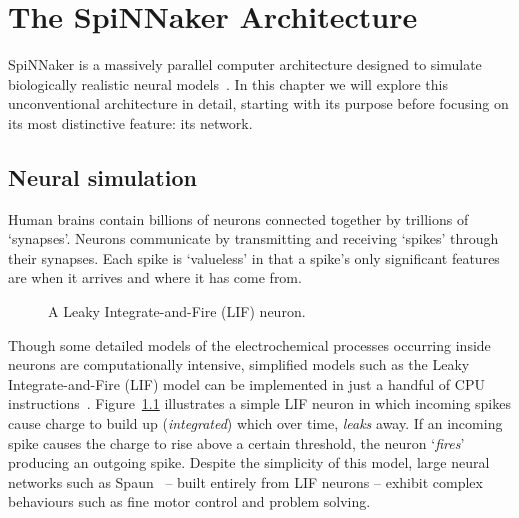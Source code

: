 \chapter{The SpiNNaker Architecture}
	
	\label{sec:background}
	
	SpiNNaker is a massively parallel computer architecture designed to simulate
	biologically realistic neural models~\cite{furber07}. In this chapter we will
	explore this unconventional architecture in detail, starting with its purpose
	before focusing on its most distinctive feature: its network.
	
	
	\section{Neural simulation}
		
		Human brains contain billions of neurons connected together by trillions of
		`synapses'. Neurons communicate by transmitting and receiving `spikes'
		through their synapses. Each spike is `valueless' in that a spike's only
		significant features are when it arrives and where it has come from.
		
		\begin{figure}
			\center
			
			\caption{A Leaky Integrate-and-Fire (LIF) neuron.}
			\label{fig:lif-neuron}
		\end{figure}
		
		Though some detailed models of the electrochemical processes occurring
		inside neurons are computationally intensive, simplified models such as the
		Leaky Integrate-and-Fire (LIF) model can be implemented in just a handful
		of CPU instructions~\cite{vainbrand11}. Figure~\ref{fig:lif-neuron}
		illustrates a simple LIF neuron in which incoming spikes cause charge to
		build up (\emph{integrated}) which over time, \emph{leaks} away. If an
		incoming spike causes the charge to rise above a certain threshold, the
		neuron `\emph{fires}' producing an outgoing spike. Despite the simplicity
		of this model, large neural networks such as Spaun~\cite{eliasmith12} --
		built entirely from LIF neurons -- exhibit complex behaviours such as fine
		motor control and problem solving.
		
